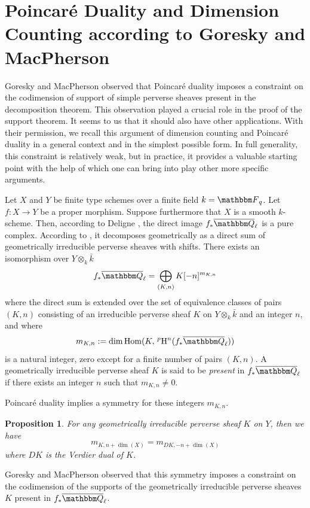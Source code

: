 \documentclass[12pt,english]{smfart}
\numberwithin{equation}{subsection}
\newtheorem{appproposition}[apptheoreme]{Proposition}
\theoremstyle{remark}
\newcommand\FF{{\mathbbm F}}
\newcommand\QQ{{\mathbbm Q}}
\newcommand\rmH{{\rm H}}
\newcommand\Hom{{\rm Hom}}
\newcommand\Ql{{\overline\QQ_\ell}}
\begin{document}
\section[Poincar\'e Duality and Dimension Counting]{Poincar\'{e} Duality and Dimension Counting according to Goresky and MacPherson}
\label{appendice GM}

Goresky and MacPherson observed that Poincar\'{e} duality imposes
a constraint on the codimension of support of simple perverse sheaves
present in the decomposition theorem. This observation played a crucial
role in the proof of the support theorem. It seems to us that it should
also have other applications. With their permission, we recall this
argument of dimension counting and Poincar\'{e} duality in a general
context and in the simplest possible form. In full generality, this
constraint is relatively weak, but in practice, it provides a valuable
starting point with the help of which one can bring into play other more
specific arguments.

Let $X$ and $Y$ be finite type schemes over a finite field $k=\FF_q$. Let
$f:X\rightarrow Y$ be a proper morphism. Suppose furthermore that $X$ is a
smooth $k$-scheme. Then, according to Deligne \cite{Weil2}, the direct image
$f_*\Ql$ is a pure complex. According to \cite{BBD}, it decomposes
geometrically as a direct sum of geometrically irreducible perverse
sheaves with shifts. There exists an isomorphism over $Y\otimes_k \bar k$
$$f_*\Ql=\bigoplus_{(K,n)} K[-n]^{m_{K,n}}$$
where the direct sum is extended over the set of equivalence classes of
pairs $(K,n)$ consisting of an irreducible perverse sheaf $K$ on $Y\otimes_k
\bar k$ and an integer $n$, and where
$$m_{K,n}:=\dim\Hom(K,\,^p\rmH^n(f_*\Ql))$$
is a natural integer, zero except for a finite number of pairs $(K,n)$. A
geometrically irreducible perverse sheaf $K$ is said to be {\em present} in $f_*\Ql$ if
there exists an integer $n$ such that $m_{K,n}\not=0$.

Poincar\'{e} duality implies a symmetry for these integers
$m_{K,n}$.

\begin{appproposition}\label{symetrie Lefschetz}
For any geometrically irreducible perverse sheaf $K$ on $Y$,
then we have
$$m_{K,n+\dim(X)}=m_{DK,-n+\dim(X)}$$
where $DK$ is the Verdier dual of $K$.
\end{appproposition}

Goresky and MacPherson observed that this symmetry imposes a
constraint on the codimension of the supports of the geometrically
irreducible perverse sheaves $K$ present in $f_*\Ql$.
\end{document}
